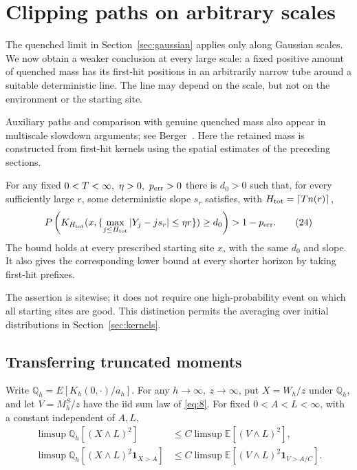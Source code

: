 \section{Clipping paths on arbitrary scales}\label{sec:clipping}

The quenched limit in Section~\ref{sec:gaussian} applies only along
Gaussian scales. We now obtain a weaker conclusion at every large scale:
a fixed positive amount of quenched mass has its first-hit positions in
an arbitrarily narrow tube around a suitable deterministic line. The line may depend on
the scale, but not on the environment or the starting site.

Auxiliary paths and comparison with genuine quenched mass also appear in
multiscale slowdown arguments; see Berger~\cite[Sections~5--6]{Berger2012}.
Here the retained mass is constructed from first-hit kernels using the
spatial estimates of the preceding sections.

\begin{proposition}\label{clip-clipping}
For any fixed \(0<T<\infty,\ \eta>0,\ p_{\rm err}>0\) there is \(d_0>0\) such that, for every sufficiently large \(r\), some deterministic slope \(s_r\) satisfies, with \(H_{\rm tot}=\lceil T n(r)\rceil\),
\[
P\left(K_{H_{\rm tot}}(x,\{\max_{j\le H_{\rm tot}}|Y_j-j s_r|\le\eta r\})\ge d_0\right)>1-p_{\rm err}.
\tag{24}\label{eq:24}
\]
The bound holds at every prescribed starting site \(x\), with the same
\(d_0\) and slope. It also gives the corresponding lower bound at every
shorter horizon by taking first-hit prefixes.
\end{proposition}

The assertion is sitewise; it does not require one high-probability event
on which all starting sites are good. This distinction permits the
averaging over initial distributions in Section~\ref{sec:kernels}.

\subsection{Transferring truncated moments}

\begin{lemma}\label{clip-moment-transfer}
Write \(\mathbb Q_h=E[K_h(0,\cdot)/a_h]\). For any \(h\to\infty,\ z\to\infty\), put \(X=W_h/z\) under \(\mathbb Q_h\), and let \(V=M_h^S/z\) have the iid sum law of \eqref{eq:8}. For fixed \(0<A<L<\infty\), with a constant independent of \(A,L\),
\[
\begin{split}
\limsup \mathbb Q_h[(X\wedge L)^2]&\le C\limsup\mathbb E[(V\wedge L)^2],\\
\limsup \mathbb Q_h[(X\wedge L)^2\mathbf1_{X>A}]&\le
 C\limsup\mathbb E[(V\wedge L)^2\mathbf1_{V>A/C}].
\end{split}
\tag{25}\label{eq:25}
\]
\end{lemma}

